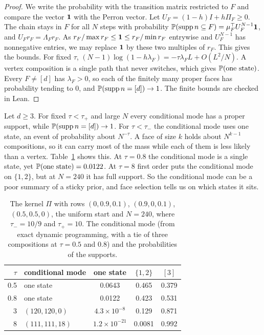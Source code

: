 \begin{proof}
We write the probability with the transition matrix restricted to $F$ and
compare the vector $\mathbf 1$ with the Perron vector. Let
$U_F=(1-h)I+h\Pi_F\ge0$. The chain stays in $F$ for all $N$ steps with
probability $\mathbb P(\operatorname{supp} n\subseteq F)=\mu_F^{\top}U_F^{N-1}\mathbf 1$, and
$U_Fr_F=\Lambda_Fr_F$. As $r_F/\max r_F\le\mathbf 1\le r_F/\min r_F$ entrywise and
$U_F^{N-1}$ has nonnegative entries, we may replace $\mathbf 1$ by these two
multiples of $r_F$. This gives the bounds. For fixed $\tau$,
$(N-1)\log(1-h\lambda_F)=-\tau\lambda_FL+O(L^2/N)$. A vertex composition is a
single path that never switches, which gives $\mathbb P(\text{one state})$. Every
$F\ne[d]$ has $\lambda_F>0$, so each of the finitely many proper faces has
probability tending to $0$, and $\mathbb P(\operatorname{supp} n=[d])\to1$. The finite bounds are
checked in Lean.
\end{proof}

\begin{remark}\label{rem:mapmass}
Let $d\ge3$. For fixed $\tau<\tau_+$ and large $N$ every conditional mode has a
proper support, while $\mathbb P(\operatorname{supp} n=[d])\to1$. For $\tau<\tau_-$ the conditional mode uses
one state, an event of probability about $N^{-\tau}$. A face of size $k$ holds
about $N^{k-1}$ compositions, so it can carry most of the mass while each of
them is less likely than a vertex. Table~\ref{tab:sticky} shows this. At
$\tau=0.8$ the conditional mode is a single state, yet $\mathbb P(\text{one state})=0.0122$. At
$\tau=8$ first
order puts the conditional mode on $\{1,2\}$, but at $N=240$ it has full support. So the
conditional mode can be a poor summary of a sticky prior, and face selection tells us
on which states it sits.
\end{remark}

\begin{table}[t]
\centering\small
\begin{tabular}{@{}rlccc@{}}
\toprule
$\tau$ & conditional mode & one state & $\{1,2\}$ & $[3]$\\
\midrule
0.5 & one state & 0.0643 & 0.465 & 0.379\\
0.8 & one state & 0.0122 & 0.423 & 0.531\\
3 & $(120,120,0)$ & $4.3\times10^{-8}$ & 0.129 & 0.871\\
8 & $(111,111,18)$ & $1.2\times10^{-21}$ & 0.0081 & 0.992\\
\bottomrule
\end{tabular}
\caption{The kernel $\Pi$ with rows $(0,0.9,0.1)$, $(0.9,0,0.1)$,
$(0.5,0.5,0)$, the uniform start and $N=240$, where $\tau_-=10/9$ and
$\tau_+=10$. The conditional mode (from exact dynamic programming, with a tie of
three compositions at $\tau=0.5$ and $0.8$) and the probabilities of the supports.}
\label{tab:sticky}
\end{table}
